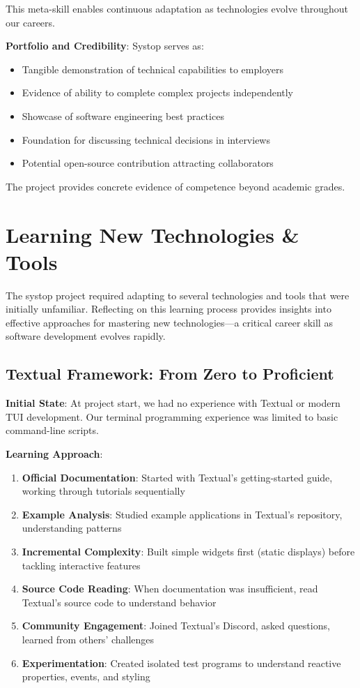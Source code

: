 \documentclass[12pt,a4paper,oneside]{report}
\begin{document}
This meta-skill enables continuous adaptation as technologies evolve throughout our careers.

\textbf{Portfolio and Credibility}: Systop serves as:
\begin{itemize}
    \item Tangible demonstration of technical capabilities to employers
    \item Evidence of ability to complete complex projects independently
    \item Showcase of software engineering best practices
    \item Foundation for discussing technical decisions in interviews
    \item Potential open-source contribution attracting collaborators
\end{itemize}

The project provides concrete evidence of competence beyond academic grades.

\section{Learning New Technologies \& Tools}
\label{sec:learning-technologies}

The systop project required adapting to several technologies and tools that were initially unfamiliar. Reflecting on this learning process provides insights into effective approaches for mastering new technologies---a critical career skill as software development evolves rapidly.

\subsection{Textual Framework: From Zero to Proficient}

\textbf{Initial State}: At project start, we had no experience with Textual or modern TUI development. Our terminal programming experience was limited to basic command-line scripts.

\textbf{Learning Approach}:

\begin{enumerate}
    \item \textbf{Official Documentation}: Started with Textual's getting-started guide, working through tutorials sequentially
    \item \textbf{Example Analysis}: Studied example applications in Textual's repository, understanding patterns
    \item \textbf{Incremental Complexity}: Built simple widgets first (static displays) before tackling interactive features
    \item \textbf{Source Code Reading}: When documentation was insufficient, read Textual's source code to understand behavior
    \item \textbf{Community Engagement}: Joined Textual's Discord, asked questions, learned from others' challenges
    \item \textbf{Experimentation}: Created isolated test programs to understand reactive properties, events, and styling
\end{enumerate}
\end{document}
